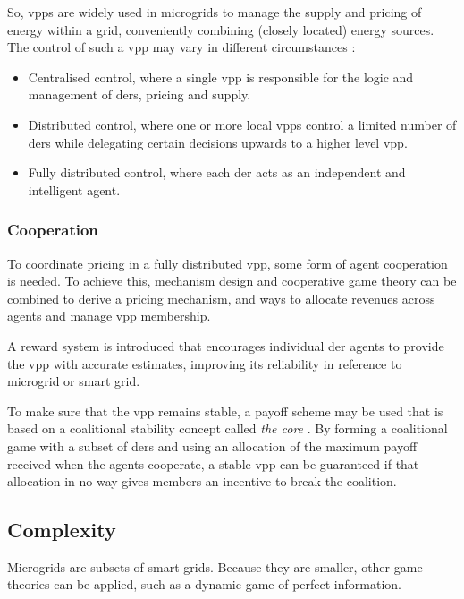So, \acp{vpp} are widely used in microgrids to manage the supply and pricing of energy within a grid, conveniently combining (closely located) energy sources. The control of such a \ac{vpp} may vary in different circumstances \cite{NikonowiczMilewski2012}:
\begin{itemize}
	\item Centralised control, where a single \ac{vpp} is responsible for the logic and management of \acp{der}, pricing and supply.
	\item Distributed control, where one or more local \acp{vpp} control a limited number of \acp{der} while delegating certain decisions upwards to a higher level \ac{vpp}.
	\item Fully distributed control, where each \ac{der} acts as an independent and intelligent agent.
\end{itemize}

\subsubsection{Cooperation}
To coordinate pricing in a fully distributed \ac{vpp}, some form of agent cooperation is needed. To achieve this, mechanism design and cooperative game theory can be combined to derive a pricing mechanism, and ways to allocate revenues across agents and manage \ac{vpp} membership\cite{ChalkiadakisRobuKotaEtAl2011}. 

A reward system is introduced that encourages individual \ac{der} agents to provide the \ac{vpp} with accurate estimates, improving its reliability in reference to microgrid or smart grid. 

To make sure that the \ac{vpp} remains stable, a payoff scheme may be used that is based on a coalitional stability concept called \emph{the core} \cite{Myerson1991}. By forming a coalitional game with a subset of \acp{der} and using an allocation of the maximum payoff received when the agents cooperate, a stable \ac{vpp} can be guaranteed if that allocation in no way gives members an incentive to break the coalition.

\subsection{Complexity}
Microgrids are subsets of smart-grids. Because they are smaller, other game theories can be applied, such as a dynamic game of perfect information. 

